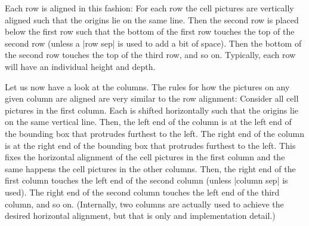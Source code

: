 Each row is aligned in this fashion: For each row the cell pictures
are vertically aligned such that the origins lie on the same
line. Then the second row is placed below the first row such that the
bottom of the first row touches the top of the second row (unless a
|row sep| is used to add a bit of space). Then the bottom of the
second row touches the top of the third row, and so on. Typically,
each row will have an individual height and depth.

\begin{codeexample}[]
\end{codeexample}

Let us now have a look at the columns. The rules for how the pictures
on any given column are aligned are very similar to the row
alignment: Consider all cell pictures in the first column. Each is
shifted horizontally such that the origins lie on the same vertical
line. Then, the left end of the column is at the left end of the
bounding box that protrudes furthest to the left. The right end of the
column is at the right end of the bounding box that protrudes furthest
to the left. This fixes the horizontal alignment of the cell pictures
in the first column and the same happens the cell pictures in the
other columns. Then, the right end of the first column touches the
left end of the second column (unless |column sep| is used). The right
end of the second column touches the left end of the third column, and
so on. (Internally, two columns are actually used to achieve the
desired horizontal alignment, but that is only and implementation
detail.) 

\begin{codeexample}[]
\end{codeexample}

